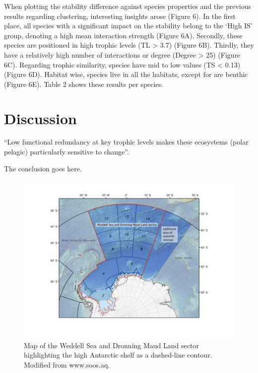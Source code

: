 \documentclass[gc, manuscript]{copernicus}
\begin{document}
When plotting the stability difference against species properties and
the previous results regarding clustering, interesting insights arose
(Figure 6). In the first place, all species with a significant impact on
the stability belong to the `High IS' group, denoting a high mean
interaction strength (Figure 6A). Secondly, these species are positioned
in high trophic levels (TL \textgreater{} 3.7) (Figure 6B). Thirdly,
they have a relatively high number of interactions or degree (Degree
\textgreater{} 25) (Figure 6C). Regarding trophic similarity, species
have mid to low values (TS \textless{} 0.13) (Figure 6D). Habitat wise,
species live in all the habitats, except for are benthic (Figure 6E).
Table 2 shows these results per species.

\section{Discussion}

``Low functional redundancy at key trophic levels makes these ecosystems
(polar pelagic) particularly sensitive to change''. \citep{Murphy2016}

\clearpage
\conclusions[Conclusions]

The conclusion goes here.

\clearpage

\begin{figure}
\includegraphics[width=12cm]{WeddellSea_map} \caption{Map of the Weddell Sea and Dronning Maud Land sector highlighting the high Antarctic shelf as a dashed-line contour. Modified from www.soos.aq.}\label{fig:unnamed-chunk-1}
\end{figure}
\end{document}
